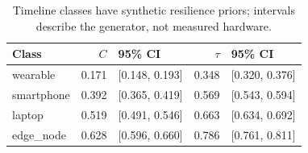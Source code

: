 \begin{table}[t]
\centering
\caption{Timeline classes have synthetic resilience priors; intervals describe the generator, not measured hardware.}
\label{tab:classes}
\small
\begin{tabular}{lrlrl}
\toprule
Class & $C$ & 95\% CI & $\tau$ & 95\% CI \\
\midrule
wearable & 0.171 & [0.148, 0.193] & 0.348 & [0.320, 0.376] \\
smartphone & 0.392 & [0.365, 0.419] & 0.569 & [0.543, 0.594] \\
laptop & 0.519 & [0.491, 0.546] & 0.663 & [0.634, 0.692] \\
edge\_node & 0.628 & [0.596, 0.660] & 0.786 & [0.761, 0.811] \\
\bottomrule
\end{tabular}
\end{table}
